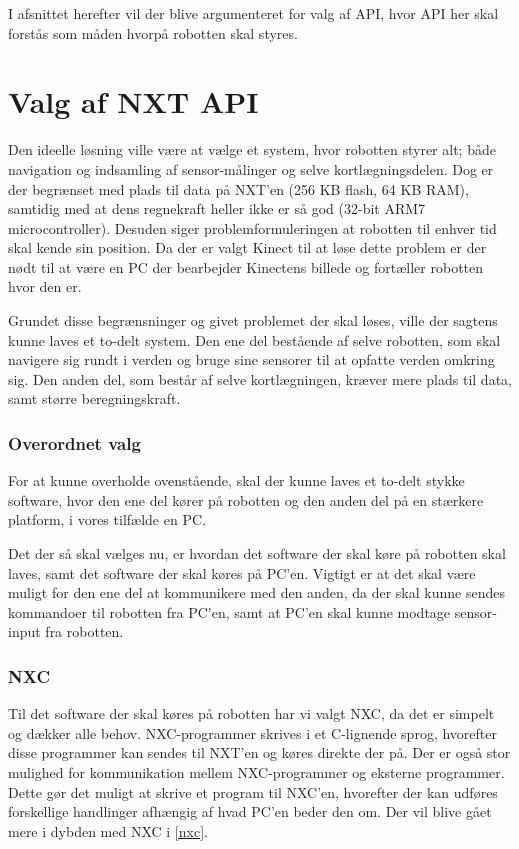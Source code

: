 I afsnittet herefter vil der blive argumenteret for valg af API, hvor API her skal forstås som måden hvorpå robotten skal styres.

\section{Valg af NXT API}\label{nxt_api}
Den ideelle løsning ville være at vælge et system, hvor robotten styrer alt; både navigation og indsamling af sensor-målinger og selve kortlægningsdelen.
Dog er der begrænset med plads til data på NXT'en (256 KB flash, 64 KB RAM), samtidig med at dens regnekraft heller ikke er så god (32-bit ARM7 microcontroller).
Desuden siger problemformuleringen at robotten til enhver tid skal kende sin position.
Da der er valgt Kinect til at løse dette problem er der nødt til at være en PC der bearbejder Kinectens billede og fortæller robotten hvor den er.

Grundet disse begrænsninger og givet problemet der skal løses, ville der sagtens kunne laves et to-delt system.
Den ene del bestående af selve robotten, som skal navigere sig rundt i verden og bruge sine sensorer til at opfatte verden omkring sig.
Den anden del, som består af selve kortlægningen, kræver mere plads til data, samt større beregningskraft.

\subsubsection*{Overordnet valg}
For at kunne overholde ovenstående, skal der kunne laves et to-delt stykke software, hvor den ene del kører på robotten og den anden del på en stærkere platform, i vores tilfælde en PC.

Det der så skal vælges nu, er hvordan det software der skal køre på robotten skal laves, samt det software der skal køres på PC'en.
Vigtigt er at det skal være muligt for den ene del at kommunikere med den anden, da der skal kunne sendes kommandoer til robotten fra PC'en, samt at PC'en skal kunne modtage sensor-input fra robotten.

\subsubsection*{NXC}
Til det software der skal køres på robotten har vi valgt NXC, da det er simpelt og dækker alle behov.
NXC-programmer skrives i et C-lignende sprog, hvorefter disse programmer kan sendes til NXT'en og køres direkte der på.
Der er også stor mulighed for kommunikation mellem NXC-programmer og eksterne programmer.
Dette gør det muligt at skrive et program til NXC'en, hvorefter der kan udføres forskellige handlinger afhængig af hvad PC'en beder den om.
Der vil blive gået mere i dybden med NXC i \cref{nxc}.

